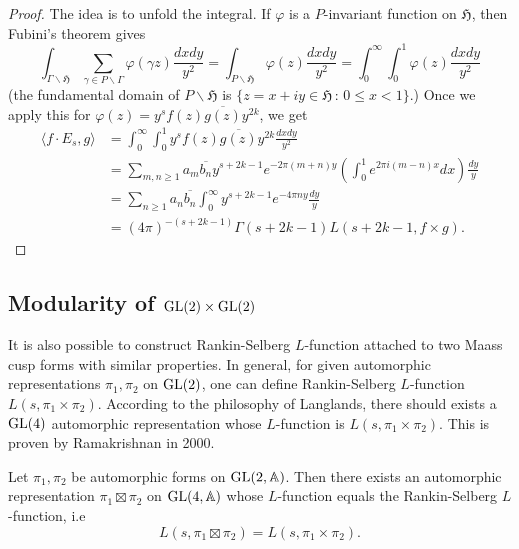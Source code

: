 \begin{proof}
The idea is to unfold the integral.
If $\varphi$ is a $P$-invariant function on $\mathfrak{H}$, then Fubini's theorem gives
$$
\int_{\Gamma\backslash \mathfrak{H}} \sum_{\gamma \in P \backslash \Gamma}\varphi(\gamma z) \frac{dxdy}{y^{2}}
=\int_{P \backslash \mathfrak{H}} \varphi(z) \frac{dxdy}{y^{2}}
= \int_{0}^{\infty} \int_{0}^{1} \varphi(z) \frac{dxdy}{y^{2}}
$$
(the fundamental domain of $P\backslash \mathfrak{H}$ is $\{z = x + iy \in \mathfrak{H}\,:\, 0\leq x < 1\}$.)
Once we apply this for $\varphi(z) = y^{s} f(z)\overline{g(z)}y^{2k}$, we get
\begin{align*}
    \langle f\cdot E_{s}, g\rangle &= \int_{0}^{\infty}\int_{0}^{1} y^{s}f(z)\overline{g(z)} y^{2k} \frac{dxdy}{y^{2}} \\
    &= \sum_{m, n \geq 1} a_{m} \overline{b_{n}}y^{s + 2k - 1} e^{-2\pi(m+n)y}  \left(\int_{0}^{1} e^{2\pi i (m - n)x}dx\right)\frac{dy}{y} \\
    &= \sum_{n\geq 1} a_{n}\overline{b_{n}} \int_{0}^{\infty} y^{s + 2k - 1} e^{-4\pi n y} \frac{dy}{y} \\
    &= (4\pi)^{-(s+2k-1)}\Gamma(s + 2k - 1) L(s+2k-1, f\times g).
\end{align*}
\end{proof}

\subsection{Modularity of $\operatorname{\mathrm{GL}}(2) \times \operatorname{\mathrm{GL}}(2)$}
It is also possible to construct Rankin-Selberg $L$-function attached to two Maass cusp forms with similar properties.
In general, for given automorphic representations $\pi_{1}, \pi_{2}$ on $\operatorname{\mathrm{GL}}(2)$,
one can define Rankin-Selberg $L$-function $L(s, \pi_{1}\times \pi_{2})$.
According to the philosophy of Langlands, there should exists a $\operatorname{\mathrm{GL}}(4)$ automorphic representation whose $L$-function 
is $L(s, \pi_{1}\times \pi_{2})$.
This is proven by Ramakrishnan in 2000.
\begin{theorem}
    \label{rankin-selberg-modularity}
    Let $\pi_{1}, \pi_{2}$ be automorphic forms on $\operatorname{\mathrm{GL}}(2, \mathbb{A})$.
    Then there exists an automorphic representation $\pi_{1} \boxtimes \pi_{2}$ on $\operatorname{\mathrm{GL}}(4, \mathbb{A})$
    whose $L$-function equals the Rankin-Selberg $L$-function, i.e 
    $$
        L(s, \pi_{1}\boxtimes \pi_{2}) = L(s, \pi_{1} \times \pi_{2}).
    $$
\end{theorem}

